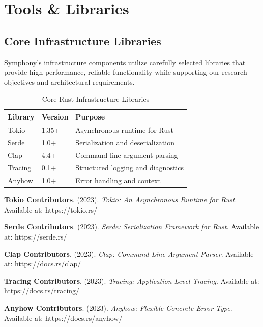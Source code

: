\section*{Tools \& Libraries}

\subsection*{Core Infrastructure Libraries}

Symphony's infrastructure components utilize carefully selected libraries that provide high-performance, reliable functionality while supporting our research objectives and architectural requirements.

\begin{table}[ht]
\centering
\begin{tabular}{@{}lll@{}}
\toprule
\textbf{Library} & \textbf{Version} & \textbf{Purpose} \\
\midrule
Tokio & 1.35+ & Asynchronous runtime for Rust \\
Serde & 1.0+ & Serialization and deserialization \\
Clap & 4.4+ & Command-line argument parsing \\
Tracing & 0.1+ & Structured logging and diagnostics \\
Anyhow & 1.0+ & Error handling and context \\
\bottomrule
\end{tabular}
\caption{Core Rust Infrastructure Libraries}
\end{table}

\begin{compactlist}
    \item \textbf{Tokio Contributors}. (2023). \textit{Tokio: An Asynchronous Runtime for Rust}. Available at: https://tokio.rs/
    \item \textbf{Serde Contributors}. (2023). \textit{Serde: Serialization Framework for Rust}. Available at: https://serde.rs/
    \item \textbf{Clap Contributors}. (2023). \textit{Clap: Command Line Argument Parser}. Available at: https://docs.rs/clap/
    \item \textbf{Tracing Contributors}. (2023). \textit{Tracing: Application-Level Tracing}. Available at: https://docs.rs/tracing/
    \item \textbf{Anyhow Contributors}. (2023). \textit{Anyhow: Flexible Concrete Error Type}. Available at: https://docs.rs/anyhow/
\end{compactlist}

